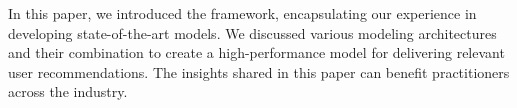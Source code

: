 In this paper, we introduced the {\systemname} framework, encapsulating our experience in developing state-of-the-art models. We discussed various modeling architectures and their combination to create a high-performance model for delivering relevant user recommendations. The insights shared in this paper can benefit practitioners across the industry. 

